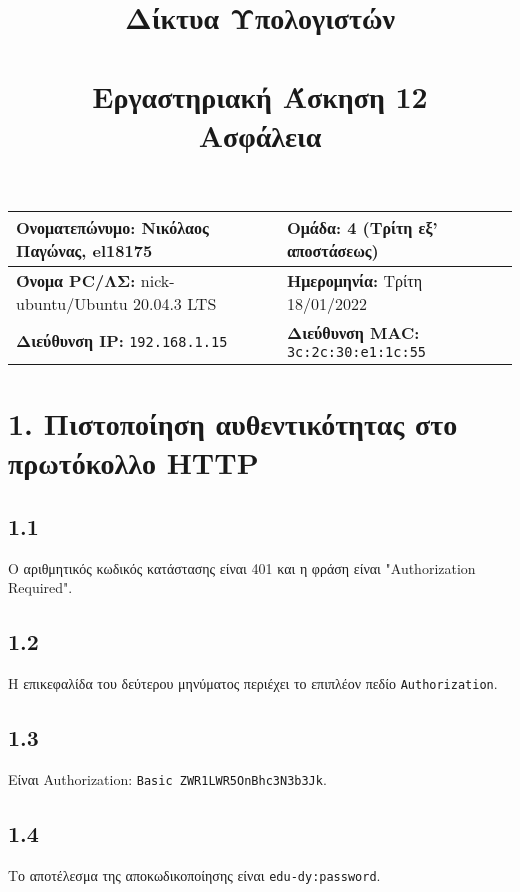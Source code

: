 

\newcommand{\imagesPath}{.}

\title{
	\textbf{Δίκτυα Υπολογιστών} \\~\\
	Εργαστηριακή Άσκηση 12 \\ 
	Ασφάλεια
}
\author{}
\date{}


	\maketitle
	
	\begin{tabular}{|l|l|}
		\hline
		\textbf{Ονοματεπώνυμο:} Νικόλαος Παγώνας, el18175 & \textbf{Ομάδα:} 4 (Τρίτη εξ' αποστάσεως) \\
		\hline
		\textbf{Όνομα PC/ΛΣ:} nick-ubuntu/Ubuntu 20.04.3 LTS & \textbf{Ημερομηνία:} Τρίτη 18/01/2022 \\
		\hline
		\textbf{Διεύθυνση IP:} \verb|192.168.1.15| & \textbf{Διεύθυνση MAC:} \verb|3c:2c:30:e1:1c:55| \\
		\hline
	\end{tabular}

	\section*{1. Πιστοποίηση αυθεντικότητας στο πρωτόκολλο HTTP}
		
		\subsection*{1.1}
			Ο αριθμητικός κωδικός κατάστασης είναι 401 και η φράση είναι "Authorization Required".
	
		\subsection*{1.2}
			Η επικεφαλίδα του δεύτερου μηνύματος περιέχει το επιπλέον πεδίο \verb|Authorization|.
	
		\subsection*{1.3}
			Είναι Authorization: \verb|Basic ZWR1LWR5OnBhc3N3b3Jk|.
	
		\subsection*{1.4}
			Το αποτέλεσμα της αποκωδικοποίησης είναι \verb|edu-dy:password|.
	
